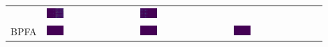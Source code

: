 \begin{tabular}{m{}*{3}{M{0.21\textwidth}}}
&\includegraphics[width=0.2\textwidth]{img/chapitre4/figure15/synth/Synth_wKSVD_matlab_band_1.png}
&\includegraphics[width=0.2\textwidth]{img/chapitre4/figure15/synth/Synth_wKSVD_matlab_band_2.png}
\\
BPFA
&\includegraphics[width=0.2\textwidth]{img/chapitre4/figure15/synth/Synth_BPFA_matlab_band_0.png}
&\includegraphics[width=0.2\textwidth]{img/chapitre4/figure15/synth/Synth_BPFA_matlab_band_1.png}
&\includegraphics[width=0.2\textwidth]{img/chapitre4/figure15/synth/Synth_BPFA_matlab_band_2.png}
\\
\end{tabular}